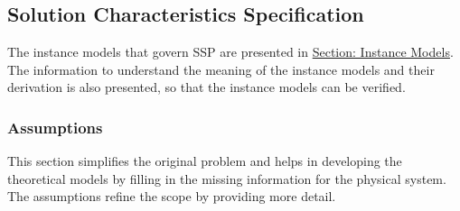 \documentclass[12pt]{article}
\begin{document}
\subsection{Solution Characteristics Specification}
\label{Sec:SolCharSpec}
The instance models that govern SSP are presented in \hyperref[Sec:IMs]{Section: Instance Models}. The information to understand the meaning of the instance models and their derivation is also presented, so that the instance models can be verified.
\subsubsection{Assumptions}
\label{Sec:Assumps}
This section simplifies the original problem and helps in developing the theoretical models by filling in the missing information for the physical system. The assumptions refine the scope by providing more detail.
\end{document}
